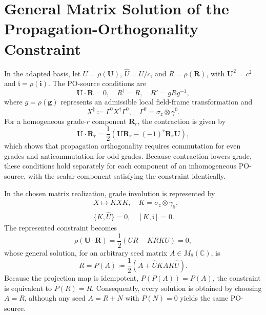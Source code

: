 
\section{General Matrix Solution of the Propagation-Orthogonality Constraint}\label{appx_general_matrix_source}
In the adapted basis, let $U=\rho(\mathbf{U})$, $\hat{U}=U/c$, and $R=\rho(\mathbf{R})$, with $\mathbf{U}^{2}=c^{2}$ and $\mathfrak{i}=\rho(\mathbf{i})$. The PO-source conditions are
\begin{equation}\label{eq_source_admissibility}
    \mathbf{U}\cdot\mathbf{R}=0,\quad R^{\ddagger}=R,\quad R'=gRg^{-1},
\end{equation}
where $g=\rho(\mathbf{g})$ represents an admissible local field-frame transformation and
\begin{equation}
    X^{\ddagger}\coloneqq\Gamma^{0}X^{\dagger}\Gamma^{0}, \quad \Gamma^{0}=\sigma_z\otimes\gamma^{0}.
\end{equation}
For a homogeneous grade-$r$ component $\mathbf{R}_r$, the contraction is given by
\begin{equation}
    \mathbf{U}\cdot\mathbf{R}_r=\frac{1}{2}\left(\mathbf{U}\mathbf{R}_r-(-1)^r\mathbf{R}_r\mathbf{U}\right),
\end{equation}
which shows that propagation orthogonality requires commutation for even grades and anticommutation for odd grades. Because contraction lowers grade, these conditions hold separately for each component of an inhomogeneous PO-source, with the scalar component satisfying the constraint identically.

In the chosen matrix realization, grade involution is represented by
\begin{subequations}
    \begin{align}
        &X\mapsto KXK, \quad K=\sigma_z\otimes\gamma_5,\\
        &\{K,\hat{U}\}=0, \quad [K,\mathfrak{i}]=0.
    \end{align}
\end{subequations}
The represented constraint becomes
\begin{equation}\label{eq_matrix_source_constraint}
    \rho\!\left(\mathbf{U}\cdot\mathbf{R}\right)=\frac{1}{2}(UR-KRKU)=0,
\end{equation}
whose general solution, for an arbitrary seed matrix $A\in M_8(\mathbb{C})$, is
\begin{equation}\label{eq_general_matrix_source}
    R=P(A)\coloneqq\frac{1}{2}\left(A+\hat{U}KAK\hat{U}\right).
\end{equation}
Because the projection map is idempotent, $P(P(A))=P(A)$, the constraint is equivalent to $P(R)=R$. Consequently, every solution is obtained by choosing $A=R$, although any seed $A=R+N$ with $P(N)=0$ yields the same PO-source.

